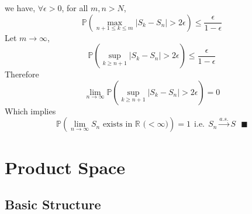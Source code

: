 \documentclass[a4paper,12pt,twoside]{book}
\begin{document}
\begin{itemize}
\begin{equation}
	\end{equation}
	we have, $\forall \epsilon>0$, for all $m,n >N$,
	\begin{equation}
		\mathbb{P}\left(\max\limits_{n+1\leq k\leq m}|S_k-S_n|>2\epsilon\right) \leq \frac{\epsilon}{1-\epsilon}
	\end{equation}
	Let $m\to \infty$,
	\begin{equation}
		\mathbb{P}\left(\sup\limits_{k\geq n+1}|S_k-S_n|>2\epsilon\right) \leq \frac{\epsilon}{1-\epsilon}
	\end{equation}
	Therefore
	\begin{equation}
		\lim\limits_{n\rightarrow\infty}\mathbb{P}\left(\sup\limits_{k\geq n+1}|S_k-S_n|>2\epsilon\right)=0
	\end{equation}
	Which implies
	\begin{equation}
		\mathbb{P}\left(\lim\limits_{n\rightarrow\infty}S_n\text{ exists in $\mathbb{R}$ ($<\infty$)}\right)=1~~\text{i.e.}~~S_n \xrightarrow{a.s.} S~~~\blacksquare
	\end{equation}

\end{itemize}

\chapter{Product Space}

\section{Basic Structure}
\end{document}
